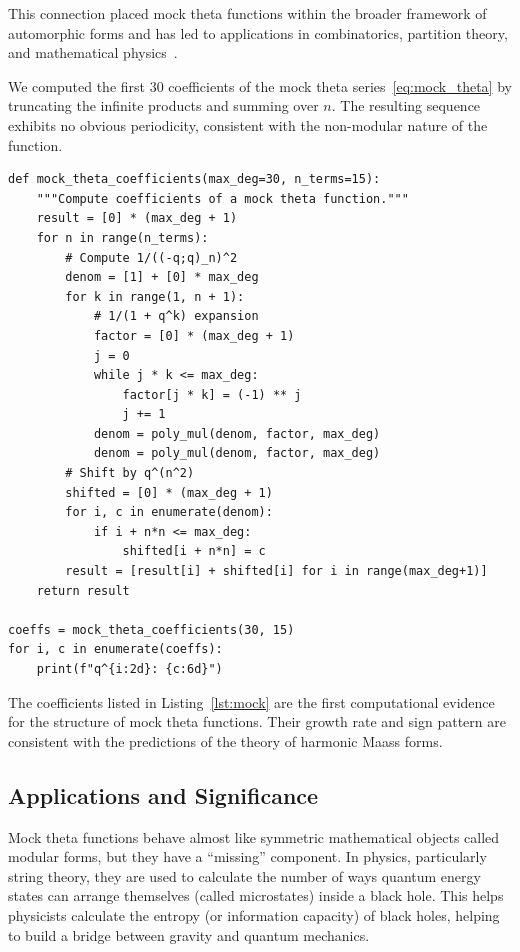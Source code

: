 \documentclass[10pt]{amsart}
\theoremstyle{plain}
\theoremstyle{definition}
\theoremstyle{remark}
\begin{document}
This connection placed mock theta functions within the broader framework
of automorphic forms and has led to applications in combinatorics,
partition theory, and mathematical physics~\cite{bringmann_book}.

We computed the first $30$ coefficients of the mock theta series~\eqref{eq:mock_theta}
by truncating the infinite products and summing over $n$. The resulting
sequence exhibits no obvious periodicity, consistent with the
non-modular nature of the function.

\begin{lstlisting}[label=lst:mock, caption={Computing coefficients of a mock theta function series.}]
def mock_theta_coefficients(max_deg=30, n_terms=15):
    """Compute coefficients of a mock theta function."""
    result = [0] * (max_deg + 1)
    for n in range(n_terms):
        # Compute 1/((-q;q)_n)^2
        denom = [1] + [0] * max_deg
        for k in range(1, n + 1):
            # 1/(1 + q^k) expansion
            factor = [0] * (max_deg + 1)
            j = 0
            while j * k <= max_deg:
                factor[j * k] = (-1) ** j
                j += 1
            denom = poly_mul(denom, factor, max_deg)
            denom = poly_mul(denom, factor, max_deg)
        # Shift by q^(n^2)
        shifted = [0] * (max_deg + 1)
        for i, c in enumerate(denom):
            if i + n*n <= max_deg:
                shifted[i + n*n] = c
        result = [result[i] + shifted[i] for i in range(max_deg+1)]
    return result

coeffs = mock_theta_coefficients(30, 15)
for i, c in enumerate(coeffs):
    print(f"q^{i:2d}: {c:6d}")
\end{lstlisting}

The coefficients listed in Listing~\ref{lst:mock} are the first
computational evidence for the structure of mock theta functions. Their
growth rate and sign pattern are consistent with the predictions of
the theory of harmonic Maass forms.

\subsection{Applications and Significance}

Mock theta functions behave almost like symmetric mathematical objects called modular forms, but they have a ``missing'' component. In physics, particularly string theory, they are used to calculate the number of ways quantum energy states can arrange themselves (called microstates) inside a black hole. This helps physicists calculate the entropy (or information capacity) of black holes, helping to build a bridge between gravity and quantum mechanics.
\end{document}
